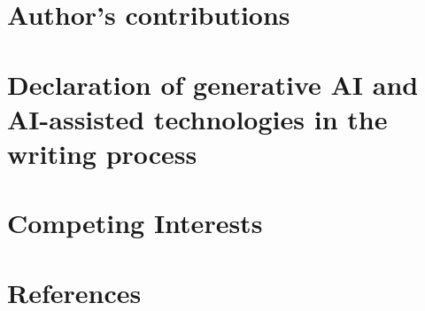 \documentclass{definitions/vnuhcmj}
\begin{document}
    \section*{Author's contributions}

    \section*{Declaration of generative AI and AI-assisted technologies in the writing process}

    \section*{Competing Interests}

    \section*{References}
    \printbibliography[heading=none]
    
\end{document}

